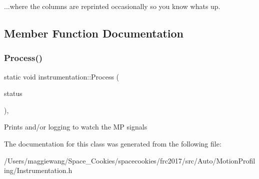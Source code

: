 ...where the columns are reprinted occasionally so you know whats up. 

\subsection{Member Function Documentation}
\mbox{\label{classinstrumentation_a0e96d2ff2bcd277f57dd1faca76c28b2}} 
\subsubsection{\texorpdfstring{Process()}{Process()}}
{\footnotesize\ttfamily static void instrumentation\+::\+Process (\begin{DoxyParamCaption}\item[{C\+A\+N\+Talon\+::\+Motion\+Profile\+Status \&}]{status }\end{DoxyParamCaption})\hspace{0.3cm}{\ttfamily [inline]}, {\ttfamily [static]}}

Prints and/or logging to watch the MP signals 

The documentation for this class was generated from the following file\+:\begin{DoxyCompactItemize}
\item 
/\+Users/maggiewang/\+Space\+\_\+\+Cookies/spacecookies/frc2017/src/\+Auto/\+Motion\+Profiling/Instrumentation.\+h\end{DoxyCompactItemize}
